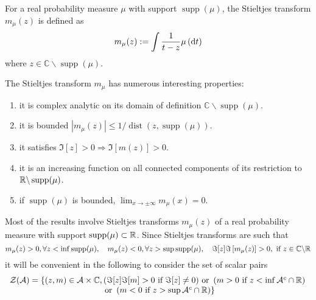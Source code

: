 \begin{definition}
	For a real probability measure $\mu$ with support $\operatorname{supp}(\mu)$, the Stieltjes transform $m_{\mu}(z)$ is defined as
	\begin{equation}
		m_{\mu}(z):=\int\frac{1}{t-z}\mu\left(\mathop{}\!\mathrm{d} t\right)
	\end{equation}
	where $z\in\mathbb{C}\backslash\operatorname{supp}(\mu)$.
\end{definition}

\begin{property}
	The Stieltjes transform $m_{\mu}$ has numerous interesting properties:
	\begin{enumerate}
		\item it is complex analytic on its domain of definition $\mathbb{C} \backslash \operatorname{supp}(\mu)$.
		\item it is bounded $\left|m_{\mu}(z)\right|\leq 1/\operatorname{dist}(z,\operatorname{supp}(\mu))$.
		\item it satisfies $\Im[z]>0 \Rightarrow \Im[m(z)]>0$.
		\item it is an increasing function on all connected components of its restriction to ${\mathbb R}\backslash\operatorname{supp}(\mu)$. %
		\item if $\operatorname{supp}(\mu)$ is bounded, $\lim_{x\rightarrow\pm\infty}m_{\mu}(x)=0$.
	\end{enumerate}
\end{property}

\begin{remark}
	Most of the results involve Stieltjes transforms $m_{\mu}(z)$ of a real probability measure with support $\operatorname{supp}(\mu) \subset {\mathbb R}$. Since Stieltjes transforms are such that
	\begin{equation*}
		m_{\mu}(z)>0,\forall z<\inf\operatorname{supp}(\mu),\quad m_{\mu}(z)<0,\forall z>\sup \operatorname{supp}(\mu),\quad\Im[z] \Im\left[m_{\mu}(z)\right]>0,\ \text{if}\ z\in\mathbb{C}\backslash\bbR
	\end{equation*}
	it will be convenient in the following to consider the set of scalar pairs
	\begin{equation*}
		\begin{array}{c}
			\mathcal{Z}(\mathcal{A})=\left\{(z,m)\in\mathcal{A}\times\mathbb{C},(\Im[z]\Im[m]>0\text{ if } \Im[z] \neq 0)\ \text{or}\ \left(m>0\text{ if }z<\inf \mathcal{A}^{c} \cap {\mathbb R}\right)\right. \\
			\left.\ \text{or}\ \left(m<0\text{ if }z>\sup \mathcal{A}^{c} \cap {\mathbb R}\right)\right\}
		\end{array}
	\end{equation*}
\end{remark}

